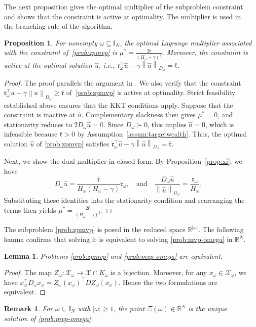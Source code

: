 \documentclass[11pt]{article}
\theoremstyle{plain}
\newtheorem{proposition}{Proposition}
\newtheorem{lemma}{Lemma}
\theoremstyle{definition}
\theoremstyle{plain}
\newtheorem{remark}{Remark}
\newcommand{\RR}{{\mathbb R}} %
\newcommand{\II}{{\mathbb I}}
\newcommand{\norm}[1]{\left\lVert#1\right\rVert}
\newcommand{\abs}[1]{\left\lvert#1\right\rvert}
\newcommand{\tpose}[1]{#1^{\top}}
\newcommand{\ccr}{{\mathfrak r}}
\newcommand{\cX}{{\mathcal X}}
\begin{document}
The next proposition gives the optimal multiplier of the subproblem constraint and shows that the constraint is active at optimality. The multiplier is used in the branching rule of the algorithm.
\begin{proposition}\label{prop:dual_solution}
For nonempty $\omega\subseteq \II_N$, the optimal Lagrange multiplier associated with the constraint of~\eqref{prob:zpmvp} is $\mu^* = \frac{2\bar{\ccr}}{(H_\omega - \gamma)^2}$.
Moreover, the constraint is active at the optimal solution $\hat u$, \textit{i.e.}, $\tpose{\ccr_\omega}\hat{u}-\gamma \norm{\hat{u}}_{D_\omega}= \bar{\ccr}$.
\end{proposition}
\begin{proof}
The proof parallels the argument in \cite[Proposition~1]{Pinar2016}. We also verify that the constraint $\tpose{\ccr_\omega}u-\gamma\norm{u}_{D_\omega}\ge\bar\ccr$ of~\eqref{prob:zpmvp} is active at optimality. Strict feasibility established above ensures that the KKT conditions apply.
Suppose that the constraint is inactive at $\hat u$. Complementary slackness
then gives $\mu^*=0$, and stationarity reduces to
$2D_\omega\hat u=0$. Since $D_\omega\succ0$, this implies $\hat u=0$,
which is infeasible because $\bar{\ccr}>0$ by
Assumption~\ref{assum:targetwealth}. Thus, the optimal solution $\hat{u}$ of \eqref{prob:zpmvp} satisfies $\tpose{\ccr_\omega}\hat{u}-\gamma \norm{\hat{u}}_{D_\omega}= \bar{\ccr}$.

Next, we show the dual multiplier in closed-form. By Proposition~\ref{prop:xi}, we have
\[
    D_\omega\hat u
    =\frac{\bar{\ccr}}{H_\omega(H_\omega-\gamma)}\ccr_\omega,
    \quad \text{and}\quad
    \frac{D_\omega\hat u}{\norm{\hat u}_{D_\omega}}
    =\frac{\ccr_\omega}{H_\omega}.
\]
Substituting these identities into the stationarity condition and rearranging the terms then yields  $\mu^*=\frac{2\bar{\ccr}}{(H_\omega-\gamma)^2}$.
 \end{proof}
The subproblem \eqref{prob:zpmvp} is posed in the reduced space $\RR^{\abs{\omega}}$. The following lemma confirms that solving it is equivalent to solving \eqref{prob:mvp-omega} in $\RR^N$.
\begin{lemma}\label{lemma5}
Problems \eqref{prob:zpmvp} and \eqref{prob:mvp-omega} are equivalent.
\end{lemma}
\begin{proof}
The map $Z_\omega:\cX_\omega\rightarrow\cX\cap K_\omega$ is a bijection. Moreover, for any $x_\omega\in\cX_\omega$, we have $\tpose{x_\omega}D_\omega x_\omega=\tpose{Z_\omega(x_\omega)}D Z_\omega(x_\omega)$. Hence the two formulations are equivalent.
\end{proof}
\begin{remark}
\label{rem:unique}
For $\omega\subseteq\II_N$ with $\abs{\omega}\geq 1$, the point $\Xi(\omega)\in\RR^N$ is the unique solution of \eqref{prob:mvp-omega}.
\end{remark}
\end{document}

